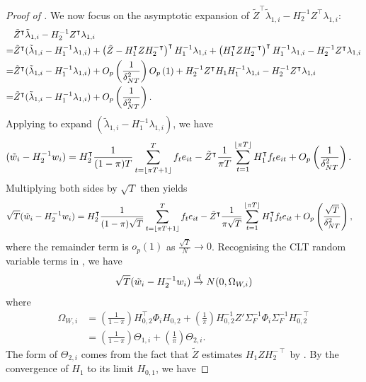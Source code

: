 \documentclass[12pt]{article}
\newcommand*{\tran}{\intercal}
\theoremstyle{plain}
\numberwithin{equation}{section}
\begin{document}
\begin{proof}[Proof of ]
We now focus on the asymptotic expansion of $\tilde{Z}^\tran \tilde{\lambda}_{1, i} - H_{2}^{-1} Z^\tran \lambda_{1, i}$:
\begin{align*}
&\tilde{Z}^\tran \tilde{\lambda}_{1, i} - H_2^{-1} Z^\tran \lambda_{1, i} \\
= &\tilde{Z}^\tran (\tilde{\lambda}_{1, i} - H_1^{-1}\lambda_{1, i}) + \left( \tilde{Z} - H_1^\tran Z H_2^{-\tran} \right)^\tran H_1^{-1}\lambda_{1, i} + \left( H_1^\tran Z H_2^{-\tran} \right)^\tran H_1^{- 1}\lambda_{1, i} - H_2^{-1} Z^\tran \lambda_{1, i} \\
= &\tilde{Z}^\tran (\tilde{\lambda}_{1, i} - H_1^{-1}\lambda_{1, i}) + \Opdeltasq \Op{1} + H_2^{-1} Z^\tran H_1 H_1^{-1} \lambda_{1, i} - H_2^{-1} Z^\tran \lambda_{1, i} \\
= &\tilde{Z}^\tran (\tilde{\lambda}_{1, i} - H_1^{-1}\lambda_{1, i}) + \Opdeltasq. 
\end{align*}
Applying  to expand $(\tilde{\lambda}_{1, i} - H_1^{- 1}\lambda_{1, i})$, we have
\begin{align*}
(\tilde{w}_{i} - H_2^{-1} w_i) &= 
H_2^\tran \frac{1}{(1 - \pi)T} \sumTfloort f_t e_{it} - 
\tilde{Z}^\tran \frac{1}{\pi T} \sumTfloor H_1^\tran f_t e_{it} +
\Opdeltasq.
\end{align*}
Multiplying both sides by $\sqrt{T}$ then yields
\begin{align*}
\sqrt{T}(\tilde{w}_{i} - H_2^{-1} w_i) &= 
H_2^\tran \frac{1}{(1 - \pi)\sqrt{T}} \sumTfloort f_t e_{it} - 
\tilde{Z}^\tran \frac{1}{\pi \sqrt{T}} \sumTfloor H_1^\tran f_t e_{it} +
\OprtTdeltasq,
\end{align*}
where the remainder term is $o_p(1)$ as $\frac{\sqrt{T}}{N} \to 0$. Recognising the CLT random variable terms in , we have
\begin{align*}
\sqrt{T}(\tilde{w}_{i} - H_2^{-1} w_i) \overset{d}{\to} N(0, \Omega_{W, i})
\end{align*}
where 
\begin{align*}
\Omega_{W, i} &= \left( \frac{1}{1 - \pi} \right) H_{0, 2}^\tran \Phi_{i} H_{0, 2} + 
\left( \frac{1}{\pi} \right) H_{0, 2}^{-1} Z' \Sigma_F^{-1} \Phi_{i} \Sigma_F^{-1} H_{0, 2}^{- \tran} \\
&= \left( \frac{1}{1 - \pi} \right) \Theta_{1, i} + \left( \frac{1}{\pi}\right)  \Theta_{2, i}.
\end{align*}
The form of $\Theta_{2, i}$ comes from the fact that $\tilde{Z}$ estimates $H_1 Z H_2^{- \tran}$ by . By the convergence of $H_{1}$ to its limit $H_{0, 1}$, we have

\end{proof}
\end{document}
